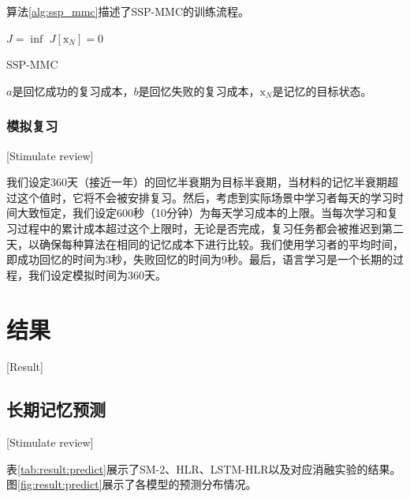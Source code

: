 算法\ref{alg:ssp_mmc}描述了SSP-MMC的训练流程。

\begin{algorithm}[htbp]
    $J = \inf$\;
    $J[\bm{\mathrm{x}}_{N}] = 0$\;
\caption{SSP-MMC}
\label{alg:ssp_mmc}
\end{algorithm}

$a$是回忆成功的复习成本，$b$是回忆失败的复习成本，$\bm{\mathrm{x}}_{N}$是记忆的目标状态。

\subsection{模拟复习}[Stimulate review]

我们设定360天（接近一年）的回忆半衰期为目标半衰期，当材料的记忆半衰期超过这个值时，它将不会被安排复习。然后，考虑到实际场景中学习者每天的学习时间大致恒定，我们设定600秒（10分钟）为每天学习成本的上限。当每次学习和复习过程中的累计成本超过这个上限时，无论是否完成，复习任务都会被推迟到第二天，以确保每种算法在相同的记忆成本下进行比较。我们使用学习者的平均时间，即成功回忆的时间为3秒，失败回忆的时间为9秒。最后，语言学习是一个长期的过程，我们设定模拟时间为360天。

\chapter{结果}[Result]

\section{长期记忆预测}[Stimulate review]

表\ref{tab:result:predict}展示了SM-2、HLR、LSTM-HLR以及对应消融实验的结果。图\ref{fig:result:predict}展示了各模型的预测分布情况。

